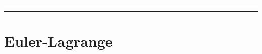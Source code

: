 








\tableofcontents			%

\begin{center}
    \rule[0mm]{150mm}{0.1mm}		%
\end{center}


\begin{abstract}		%
    
\end{abstract}

\begin{center}
    \rule[0mm]{150mm}{0.1mm}
\end{center}

\section{Euler-Lagrange}


